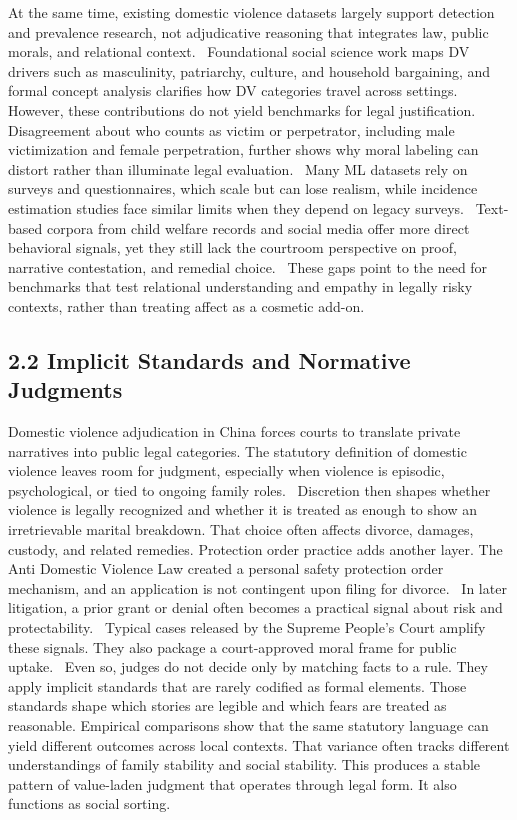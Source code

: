 At the same time, existing domestic violence datasets largely support detection and prevalence research, not adjudicative reasoning that integrates law, public morals, and relational context.~\cite{ref52} Foundational social science work maps DV drivers such as masculinity, patriarchy, culture, and household bargaining, and formal concept analysis clarifies how DV categories travel across settings. However, these contributions do not yield benchmarks for legal justification.~\cite{ref53} Disagreement about who counts as victim or perpetrator, including male victimization and female perpetration, further shows why moral labeling can distort rather than illuminate legal evaluation.~\cite{ref54} Many ML datasets rely on surveys and questionnaires, which scale but can lose realism, while incidence estimation studies face similar limits when they depend on legacy surveys.~\cite{ref55} Text-based corpora from child welfare records and social media offer more direct behavioral signals, yet they still lack the courtroom perspective on proof, narrative contestation, and remedial choice.~\cite{ref56} These gaps point to the need for benchmarks that test relational understanding and empathy in legally risky contexts, rather than treating affect as a cosmetic add-on.

\hypertarget{implicit-standards-and-normative-judgments}{%
\subsection{\texorpdfstring{\textbf{2.2 Implicit Standards and Normative Judgments}}{2.2 Implicit Standards and Normative Judgments}}\label{implicit-standards-and-normative-judgments}}

Domestic violence adjudication in China forces courts to translate private narratives into public legal categories. The statutory definition of domestic violence leaves room for judgment, especially when violence is episodic, psychological, or tied to ongoing family roles.~\cite{ref57} Discretion then shapes whether violence is legally recognized and whether it is treated as enough to show an irretrievable marital breakdown. That choice often affects divorce, damages, custody, and related remedies. Protection order practice adds another layer. The Anti Domestic Violence Law created a personal safety protection order mechanism, and an application is not contingent upon filing for divorce.~\cite{ref58} In later litigation, a prior grant or denial often becomes a practical signal about risk and protectability.~\cite{ref59} Typical cases released by the Supreme People's Court amplify these signals. They also package a court-approved moral frame for public uptake.~\cite{ref60} Even so, judges do not decide only by matching facts to a rule. They apply implicit standards that are rarely codified as formal elements. Those standards shape which stories are legible and which fears are treated as reasonable. Empirical comparisons show that the same statutory language can yield different outcomes across local contexts. That variance often tracks different understandings of family stability and social stability. This produces a stable pattern of value-laden judgment that operates through legal form. It also functions as social sorting.~\cite{ref61}

